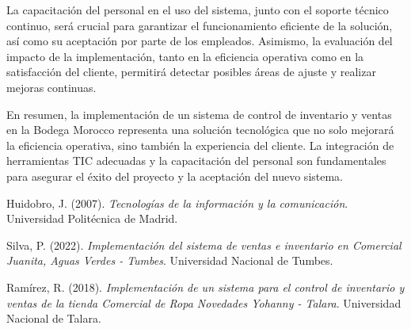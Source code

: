 \documentclass{article}
\begin{document}
La capacitación del personal en el uso del sistema, junto con el soporte técnico continuo, será crucial para garantizar el funcionamiento eficiente de la solución, así como su aceptación por parte de los empleados. Asimismo, la evaluación del impacto de la implementación, tanto en la eficiencia operativa como en la satisfacción del cliente, permitirá detectar posibles áreas de ajuste y realizar mejoras continuas.

En resumen, la implementación de un sistema de control de inventario y ventas en la Bodega Morocco representa una solución tecnológica que no solo mejorará la eficiencia operativa, sino también la experiencia del cliente. La integración de herramientas TIC adecuadas y la capacitación del personal son fundamentales para asegurar el éxito del proyecto y la aceptación del nuevo sistema.

  \begin{thebibliography}{}

    Huidobro, J. (2007). \textit{Tecnologías de la información y la comunicación}. Universidad Politécnica de Madrid.
    
    Silva, P. (2022). \textit{Implementación del sistema de ventas e inventario en Comercial Juanita, Aguas Verdes - Tumbes}. Universidad Nacional de Tumbes.
    
    Ramírez, R. (2018). \textit{Implementación de un sistema para el control de inventario y ventas de la tienda Comercial de Ropa Novedades Yohanny - Talara}. Universidad Nacional de Talara.
    
    \end{thebibliography}
    
\end{document}
